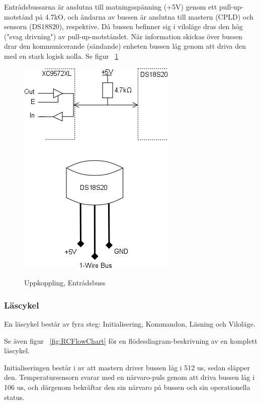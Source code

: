 \documentclass[a4paper,11pt]{article}
\begin{document}
	Entrådsbussarna är anslutna till matningsspänning (+5V) genom ett pull-up-motstånd på 4.7kO, och
	ändarna av bussen är anslutna till mastern (CPLD) och sensorn (DS18S20), respektive. Då bussen
	befinner sig i viloläge dras den hög ("svag drivning") av pull-up-motståndet. När information
	skickas över bussen drar den kommunicerande (sändande) enheten bussen låg genom att driva den
	med en stark logisk nolla. Se figur ~\ref{fig:TempBus}

		\begin{figure}[ht!tb]
		  \centering
		      \includegraphics[scale=1, angle=0]{TempBus.png}
			\label{fig:TempBus}
		  	\caption{Uppkoppling, Entrådsbuss}
		\end{figure}

	\subsubsection{Läscykel}

	En läscykel består av fyra steg: Initialisering, Kommandon, Läsning och Viloläge.

	Se även figur ~\ref{fig:RCFlowChart} för en flödesdiagram-beskrivning av en komplett läscykel.

	Initialiseringen består i av att mastern driver bussen låg i 512 us, sedan släpper den.
	Temperatursensorn svarar med en närvaro-puls genom att driva bussen låg i 106 us, och därgenom bekräftar den sin 	 närvaro på bussen och sin operationella status.
\end{document}
